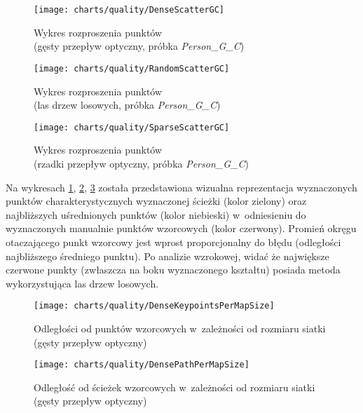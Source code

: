     \newpage
    \begin{figure}[!ht]
      \centering
      \texttt{[image: charts/quality/DenseScatterGC]}
      \caption[Wykres rozproszenia punktów]
              {Wykres rozproszenia punktów\\(gęsty przepływ optyczny, próbka \textit{Person\_G\_C})}
      \label{fig:DenseScatterGC}
    \end{figure}

    \begin{figure}[!ht]
      \centering
      \texttt{[image: charts/quality/RandomScatterGC]}
      \caption[Wykres rozproszenia punktów]
              {Wykres rozproszenia punktów\\(las drzew losowych, próbka \textit{Person\_G\_C})}
      \label{fig:RandomScatterGC}
    \end{figure}

    \begin{figure}[!ht]
      \centering
      \texttt{[image: charts/quality/SparseScatterGC]}
      \caption[Wykres rozproszenia punktów]
              {Wykres rozproszenia punktów\\(rzadki przepływ optyczny, próbka \textit{Person\_G\_C})}
      \label{fig:SparseScatterGC}
    \end{figure}

    Na wykresach \ref{fig:DenseScatterGC}, \ref{fig:RandomScatterGC}, \ref{fig:SparseScatterGC} została przedstawiona wizualna reprezentacja wyznaczonych punktów charakterystycznych wyznaczonej ścieżki (kolor zielony) oraz najbliższych uśrednionych punktów (kolor niebieski) w~odniesieniu do wyznaczonych manualnie punktów wzorcowych (kolor czerwony). Promień okręgu otaczającego punkt wzorcowy jest wprost proporcjonalny do błędu (odległości najbliższego średniego punktu). Po analizie wzrokowej, widać że największe czerwone punkty (zwłaszcza na boku wyznaczonego kształtu) posiada metoda wykorzystująca las drzew losowych.

    \begin{figure}[!ht]
      \centering
      \texttt{[image: charts/quality/DenseKeypointsPerMapSize]}
      \caption[Odległości od punktów wzorcowych w~zależności od rozmiaru siatki]
              {Odległości od punktów wzorcowych w~zależności od rozmiaru siatki (gęsty przepływ optyczny)}
      \label{fig:DenseKeypointsPerMapSize}
    \end{figure}

    \begin{figure}[!ht]
      \centering
      \texttt{[image: charts/quality/DensePathPerMapSize]}
      \caption[Odległość od ścieżek wzorcowych w~zależności od rozmiaru siatki]
              {Odległość od ścieżek wzorcowych w~zależności od rozmiaru siatki (gęsty przepływ optyczny)}
      \label{fig:DensePathPerMapSize}
    \end{figure}

